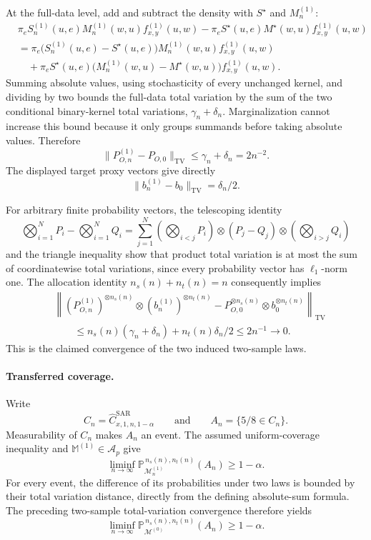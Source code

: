 At the full-data level, add and subtract the density with \(S^{\star}\) and \(M^{(1)}_n\):
\[
\begin{split}
&\pi_eS^{(1)}_n(u,e)M^{(1)}_n(w,u)f^{(1)}_{x,y}(u,w)
-\pi_eS^{\star}(u,e)M^{\star}(w,u)f^{(1)}_{x,y}(u,w)\\
&=\pi_e\bigl(S^{(1)}_n(u,e)-S^{\star}(u,e)\bigr)
M^{(1)}_n(w,u)f^{(1)}_{x,y}(u,w)\\
&\quad+\pi_eS^{\star}(u,e)
\bigl(M^{(1)}_n(w,u)-M^{\star}(w,u)\bigr)f^{(1)}_{x,y}(u,w).
\end{split}
\]
Summing absolute values, using stochasticity of every unchanged kernel, and dividing by two bounds the full-data total variation by the sum of the two conditional binary-kernel total variations, \(\gamma_n+\delta_n\). Marginalization cannot increase this bound because it only groups summands before taking absolute values. Therefore
\[
\lVert P^{(1)}_{O,n}-P_{O,0}\rVert_{\mathrm{TV}}
\le\gamma_n+\delta_n=2n^{-2}.
\]
The displayed target proxy vectors give directly
\[
\lVert b^{(1)}_n-b_0\rVert_{\mathrm{TV}}=\delta_n/2.
\]

For arbitrary finite probability vectors, the telescoping identity
\[
\bigotimes_{i=1}^N P_i-
\bigotimes_{i=1}^N Q_i
=\sum_{j=1}^N
\left(\bigotimes_{i<j}P_i\right)\otimes(P_j-Q_j)\otimes
\left(\bigotimes_{i>j}Q_i\right)
\]
and the triangle inequality show that product total variation is at most the sum of coordinatewise total variations, since every probability vector has \(\ell_1\)-norm one. The allocation identity \(n_s(n)+n_t(n)=n\) consequently implies
\[
\begin{split}
&\left\lVert
(P^{(1)}_{O,n})^{\otimes n_s(n)}\otimes(b^{(1)}_n)^{\otimes n_t(n)}
-P_{O,0}^{\otimes n_s(n)}\otimes b_0^{\otimes n_t(n)}
\right\rVert_{\mathrm{TV}}\\
&\qquad\le n_s(n)(\gamma_n+\delta_n)+n_t(n)\delta_n/2
\le 2n^{-1}\longrightarrow0.
\end{split}
\]
This is the claimed convergence of the two induced two-sample laws.

\paragraph{Transferred coverage.}
Write
\[
C_n=\widehat C^{\mathrm{SAR}}_{x,1,n,1-\alpha}
\qquad\text{and}\qquad
A_n=\{5/8\in C_n\}.
\]
Measurability of \(C_n\) makes \(A_n\) an event. The assumed uniform-coverage inequality and \(\mathbb M^{(1)}\in\mathcal A_p\) give
\[
\liminf_{n\to\infty}
\mathbb P_{\mathcal M^{(1)}_n}^{\,n_s(n),n_t(n)}(A_n)
\ge1-\alpha.
\]
For every event, the difference of its probabilities under two laws is bounded by their total variation distance, directly from the defining absolute-sum formula. The preceding two-sample total-variation convergence therefore yields
\[
\liminf_{n\to\infty}
\mathbb P_{\mathcal M^{(0)}}^{\,n_s(n),n_t(n)}(A_n)
\ge1-\alpha. \tag{1}
\]

